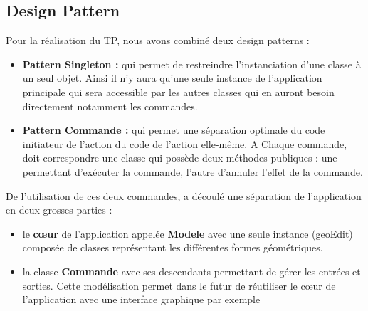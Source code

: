 \documentclass[12pt]{article}
\begin{document}
\subsection{Design Pattern}
Pour la réalisation du TP, nous avons combiné deux design patterns :
\begin{itemize}
\item \textbf{Pattern Singleton :} qui permet de restreindre l'instanciation d’une classe à un seul objet. Ainsi il n’y aura qu’une seule instance de l’application principale qui sera accessible par les autres classes qui en auront besoin directement notamment les commandes.
\item \textbf{Pattern Commande :} qui permet une séparation optimale du code initiateur de l’action du code de l’action elle-même. A Chaque commande, doit correspondre une classe qui possède deux méthodes publiques : une permettant d’exécuter la commande, l’autre d’annuler l’effet de la commande. 
\end{itemize}
De l’utilisation de ces deux commandes, a découlé une séparation de l’application en deux grosses parties :
\begin{itemize}
\item le \textbf{c\oe{}ur} de l’application appelée \textbf{Modele} avec une seule instance (geoEdit) composée de classes représentant les différentes formes géométriques.
\item la classe \textbf{Commande} avec ses descendants permettant de gérer les entrées et sorties. Cette modélisation permet dans le futur de réutiliser le c\oe{}ur de l’application avec une interface graphique par exemple
\end{itemize}
\end{document}
